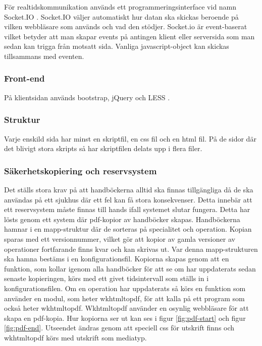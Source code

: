 För realtidskommunikation används ett programmeringsinterface vid namn Socket.IO \cite{socketio}.
Socket.IO väljer automatiskt hur datan ska skickas beroende på vilken webbläsare som används och vad den stödjer.
Socket.io är event-baserat vilket betyder att man skapar events på antingen klient eller serversida som man sedan kan trigga från motsatt sida.
Vanliga javascript-object kan skickas tillsammans med eventen.

\subsubsection{Front-end}
På klientsidan används bootstrap\cite{bootstrap}, jQuery\cite{jquery} och LESS \cite{less}.

\subsubsection{Struktur}
Varje enskild sida har minst en skriptfil, en css fil och en html fil. På de sidor där det blivigt stora skripts så har skriptfilen delats upp i flera filer.

\subsubsection{Säkerhetskopiering och reservsystem}
Det ställs stora krav på att handböckerna alltid ska finnas tillgängliga då de ska användas på ett sjukhus där ett fel kan få stora konsekvenser. Detta innebär att ett reservsystem måste finnas till hands ifall systemet slutar fungera. Detta har lösts genom ett system där pdf-kopior av handböcker skapas. Handböckerna hamnar i en mapp-struktur där de sorteras på specialitet och operation. Kopian sparas med ett versionnummer, vilket gör att kopior av gamla versioner av operationer fortfarande finns kvar och kan skrivas ut. Var denna mapp-strukturen ska hamna bestäms i en konfigurationsfil.
Kopiorna skapas genom att en funktion, som kollar igenom alla handböcker för att se om har uppdaterats sedan senaste kopieringen, körs med ett givet tidsintervall som ställs in i konfigurationsfilen. Om en operation har uppdaterats så körs en funktion som använder en modul, som heter wkhtmltopdf, för att kalla på ett program som också heter wkhtmltopdf. Wkhtmltopdf använder en osynlig webbläsare för att skapa en pdf-kopia. Hur kopiorna ser ut kan ses i figur \ref{fig:pdf-start} och figur \ref{fig:pdf-end}. Utseendet ändras genom att speciell css för utskrift finns och wkhtmltopdf körs med utskrift som mediatyp.  

